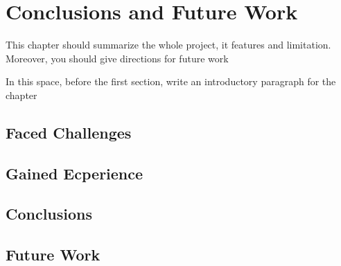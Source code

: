 \section{Conclusions and Future Work}
This chapter should summarize the whole project, it features and limitation. Moreover, you should give directions for future work

In this space, before the first section, write an introductory paragraph for the chapter


\subsection{Faced Challenges}
\subsection{Gained Ecperience}
\subsection{Conclusions}
\subsection{Future Work}
